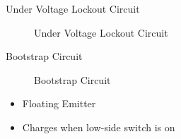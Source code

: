 
\begin{frame}{Under Voltage Lockout Circuit}
	\begin{figure}
		\centering


		\caption{Under Voltage Lockout Circuit}
	\end{figure}
\end{frame}


\begin{frame}{Bootstrap Circuit}
	\begin{figure}
		\centering


		\caption{Bootstrap Circuit}
	\end{figure}

	\begin{itemize}
		\item Floating Emitter
		\item Charges when low-side switch is on
	\end{itemize}
\end{frame}




